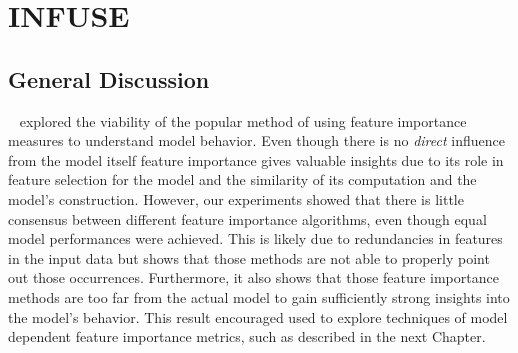 \chapter{INFUSE}
\label{chap:infuse}


\section{General Discussion}
\infuse~\cite{infuse} explored the viability of the popular method of using feature importance measures to understand model behavior.
Even though there is no \emph{direct} influence from the model itself feature importance gives valuable insights due to its role in feature selection for the model and the similarity of its computation and the model's construction.
However, our experiments showed that there is little consensus between different feature importance algorithms, even though equal model performances were achieved.
This is likely due to redundancies in features in the input data but shows that those methods are not able to properly point out those occurrences.
Furthermore, it also shows that those feature importance methods are too far from the actual model to gain sufficiently strong insights into the model's behavior.
This result encouraged used to explore techniques of model dependent feature importance metrics, such as \prospector described in the next Chapter.


